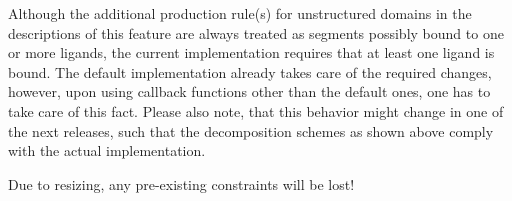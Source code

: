 
\begin{DoxyRefList}
\item[\label{bug__bug000002}%
\Hypertarget{bug__bug000002}%
Module \hyperlink{group__domains__up}{domains\+\_\+up} ]Although the additional production rule(s) for unstructured domains in the descriptions of this feature are always treated as \textquotesingle{}segments possibly bound to one or more ligands\textquotesingle{}, the current implementation requires that at least one ligand is bound. The default implementation already takes care of the required changes, however, upon using callback functions other than the default ones, one has to take care of this fact. Please also note, that this behavior might change in one of the next releases, such that the decomposition schemes as shown above comply with the actual implementation. 
\item[\label{bug__bug000001}%
\Hypertarget{bug__bug000001}%
Global \hyperlink{group__subopt__zuker_gababde9d210eb433854f1e71da7815fbb}{vrna\+\_\+subopt\+\_\+zuker} (vrna\+\_\+fold\+\_\+compound\+\_\+t $\ast$vc)]Due to resizing, any pre-\/existing constraints will be lost!
\end{DoxyRefList}